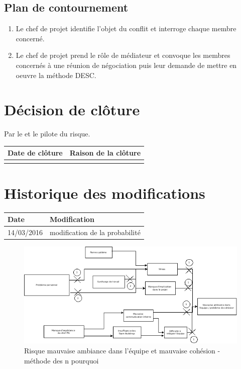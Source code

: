 \flushleft
\subsection*{Plan de contournement}

\begin{enumerate}
	\item Le chef de projet identifie l'objet du conflit et interroge chaque membre concerné.
	\item Le chef de projet prend le rôle de médiateur et convoque les membres concernés à une réunion de négociation puis leur demande de mettre en oeuvre la méthode DESC.
\end{enumerate}

\section*{Décision de clôture}
Par le \CP{} et le pilote du risque.
\begin{table}[H]
\centering
	\begin{tabularx}{16.8cm}{|X|X|}
	\hline
	\rowcolor{gray!40} Date de clôture & Raison de la clôture \\
	\hline
	  & \\
	\hline
	\end{tabularx}
\end{table}

\section*{Historique des modifications}
\begin{table}[H]
\centering
	\begin{tabularx}{16.8cm}{|X|X|}
	\hline
	\rowcolor{gray!40} Date & Modification \\
	\hline
	 14/03/2016 & modification de la probabilité\\
	\hline
	\end{tabularx}
\end{table}
\newpage

\begin{figure}
	\centering
	\includegraphics[scale=0.6]{images/AnalyseRisque_nPourquoi_FDR002}
	\caption{\label{risque mauvaise ambiance dans l'équipe et mauvaise cohesion}Risque mauvaise ambiance dans l'équipe et mauvaise cohésion - méthode des n pourquoi}
\end{figure}
